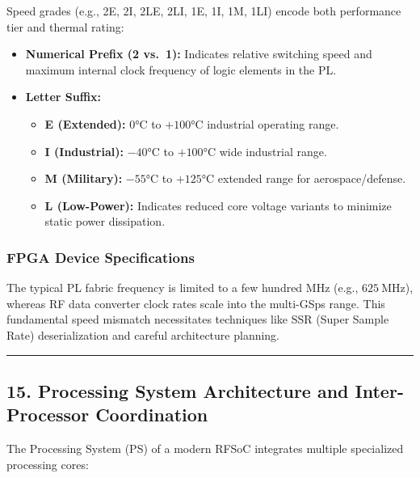 \documentclass[
]{article}
\providecommand{\tightlist}{%
  \setlength{\itemsep}{0pt}\setlength{\parskip}{0pt}}
\begin{document}
Speed grades (e.g., 2E, 2I, 2LE, 2LI, 1E, 1I, 1M, 1LI) encode both
performance tier and thermal rating:

\begin{itemize}
\tightlist
\item
  \textbf{Numerical Prefix (2 vs.~1):} Indicates relative switching
  speed and maximum internal clock frequency of logic elements in the
  PL.
\item
  \textbf{Letter Suffix:}

  \begin{itemize}
  \tightlist
  \item
    \textbf{E (Extended):} \(0°\text{C}\) to \(+100°\text{C}\)
    industrial operating range.
  \item
    \textbf{I (Industrial):} \(-40°\text{C}\) to \(+100°\text{C}\) wide
    industrial range.
  \item
    \textbf{M (Military):} \(-55°\text{C}\) to \(+125°\text{C}\)
    extended range for aerospace/defense.
  \item
    \textbf{L (Low-Power):} Indicates reduced core voltage variants to
    minimize static power dissipation.
  \end{itemize}
\end{itemize}

\subsubsection{FPGA Device
Specifications}\label{fpga-device-specifications}

The typical PL fabric frequency is limited to a few hundred MHz (e.g.,
\(625\ \text{MHz}\)), whereas RF data converter clock rates scale into
the multi-GSps range. This fundamental speed mismatch necessitates
techniques like SSR (Super Sample Rate) deserialization and careful
architecture planning.

\begin{center}\rule{0.5\linewidth}{0.5pt}\end{center}

\subsection{15. Processing System Architecture and Inter-Processor
Coordination}\label{processing-system-architecture-and-inter-processor-coordination}

The Processing System (PS) of a modern RFSoC integrates multiple
specialized processing cores:
\end{document}
